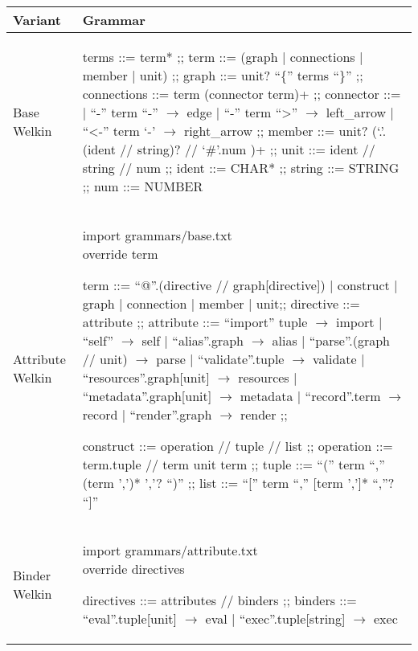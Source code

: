 \begin{table}[hbt!]
  \centering
    \begin{tabular}{| p{1.5cm} | p{9.5cm} |}%
    \hline
    Variant & Grammar \\\hline %
      \makecell{Base \\ Welkin} &
  \begin{bnf}
  terms ::= term* ;;
  term ::= (graph | connections | member | unit) ;;
  graph ::= unit? ``\{'' terms ``\}'' ;;
  connections ::= term (connector term)+ ;;
	connector ::=
   | ``-'' term ``-'' $\to$ edge
   | ``-'' term ``>'' $\to$ left\_arrow
	 | ``<-'' term `-' $\to$ right\_arrow ;;
  member ::= unit? (`.'.(ident // string)? // `\#'.num )+ ;;
	unit ::= ident // string // num ;;
  ident ::= CHAR* ;;
	string ::= STRING ;;
	num ::= NUMBER
\end{bnf} \\ %
   \hline
      Attribute Welkin &
  \makecell{import grammars/base.txt \\ override term}
  \begin{bnf}

  term ::= ``@''.(directive // graph[directive]) | construct | graph | connection | member | unit;;
  directive ::= attribute ;;
  attribute ::= ``import'' tuple $\to$ import
  | ``self'' $\to$ self
  | ``alias''.graph $\to$ alias
  | ``parse''.(graph // unit) $\to $ parse
  | ``validate''.tuple $\to$ validate
  | ``resources''.graph[unit] $\to$ resources
  | ``metadata''.graph[unit] $\to$ metadata
  | ``record''.term $\to$ record
  | ``render''.graph $\to$ render ;;

  construct ::= operation // tuple // list ;;
  operation ::= term.tuple // term unit term ;;
  tuple ::= ``('' term ``,'' (term ',')* ','? ``)'' ;;
  list ::= ``['' term ``,'' [term ',']* ``,''? ``]''
 \end{bnf} \\
   \hline
   Binder Welkin &
\makecell{import grammars/attribute.txt \\ override directives}
    \begin{bnf}
     directives ::= attributes // binders ;;
     binders ::= ``eval''.tuple[unit] $\to$ eval
     | ``exec''.tuple[string] $\to$ exec
   \end{bnf} \\ %
    \hline
    \end{tabular}
  \end{table}

